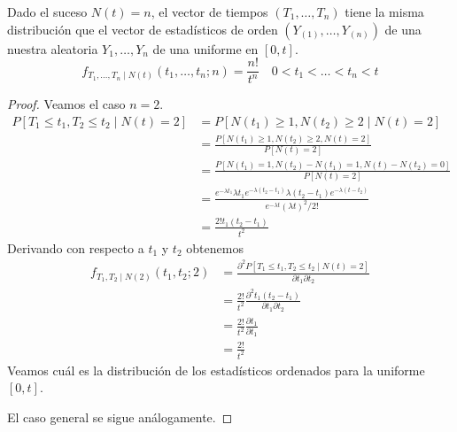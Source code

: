 \documentclass[PREyA.tex]{subfiles}
\begin{document}
\begin{prop}
Dado el suceso $N(t)=n$, el vector de tiempos $(T_1,\dotsc,T_n)$ tiene la misma distribución que el vector de estadísticos de orden $(Y_{(1)},\dotsc,Y_{(n)})$ de una nuestra aleatoria $Y_1,\dotsc,Y_n$ de una uniforme en $[0,t]$.
$$
f_{T_1,\dotsc,T_n\mid N(t)}(t_1,\dotsc,t_n;n) = \frac{n!}{t^n} \quad 0<t_1<\dotsc<t_n < t
$$
\end{prop}
\begin{proof}
Veamos el caso $n=2$.
\begin{align*}
P[T_1\leq t_1,T_2 \leq t_2 \mid N(t)=2] & = P[N(t_1) \geq 1, N(t_2)\geq 2 \mid N(t)=2]\\
&= \frac{ P[N(t_1) \geq 1, N(t_2)\geq 2, N(t)=2]}{P[N(t)=2]}\\
&= \frac{P[N(t_1)=1,N(t_2)-N(t_1) =1, N(t)-N(t_2)=0]}{P[N(t)=2]}\\
&= \frac{e^{-\lambda t_1}\lambda t_1 e^{-\lambda(t_2-t_1)}\lambda(t_2-t_1) e^{-\lambda(t-t_2)}}{e^{-\lambda t}(\lambda t)^2/2!}\\
&= \frac{2!t_1(t_2-t_1)}{t^2}
\end{align*}
Derivando con respecto a $t_1$ y $t_2$ obtenemos 
\begin{align*}
f_{T_1,T_2\mid N(2)}(t_1,t_2;2) &= \frac{\partial^2 P[T_1\leq t_1,T_2 \leq t_2 \mid N(t)=2] }{\partial t_1 \partial t_2}\\
&= \frac{2!}{t^2}\frac{\partial^2 t_1(t_2-t_1)}{\partial t_1 \partial t_2}\\
&=\frac{2!}{t^2}\frac{\partial t_1}{\partial t_1}\\
&= \frac{2!}{t^2}
\end{align*}
Veamos cuál es la distribución de los estadísticos ordenados para la uniforme $[0,t]$. 

El caso general se sigue análogamente.
\end{proof}
\end{document}
